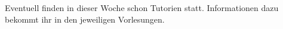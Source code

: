 

\footnotesize{Eventuell finden in dieser Woche schon Tutorien statt. Informationen dazu bekommt ihr in den jeweiligen Vorlesungen.}
\normalsize
\newpage
